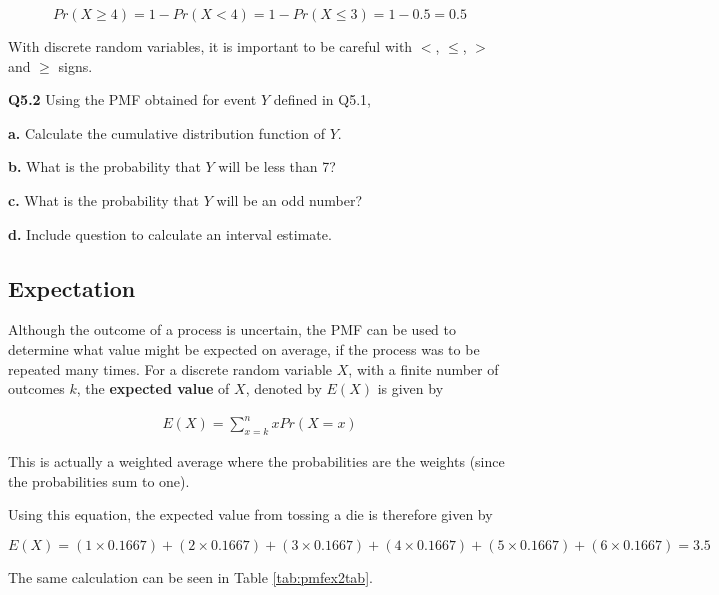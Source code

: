 \documentclass[
  oneside]{krantz}
\begin{document}
\[Pr(X \ge 4) = 1 - Pr(X < 4) = 1 - Pr(X \le 3) = 1 - 0.5 = 0.5\]

With discrete random variables, it is important to be careful with \(<\), \(\le\), \(>\) and \(\ge\) signs.

\textbf{Q5.2} Using the PMF obtained for event \(Y\) defined in Q5.1,

\textbf{a.} Calculate the cumulative distribution function of \(Y\).

\textbf{b.} What is the probability that \(Y\) will be less than 7?

\textbf{c.} What is the probability that \(Y\) will be an odd number?

\textbf{d.} Include question to calculate an interval estimate.

\hypertarget{expectation}{%
\subsection{Expectation}\label{expectation}}

Although the outcome of a process is uncertain, the PMF can be used to determine what value might be expected on average, if the process was to be repeated many times. For a discrete random variable \(X\), with a finite number of outcomes \(k\), the \textbf{expected value} of \(X\), denoted by \(E(X)\) is given by

\begin{align}
E(X) = \sum_{x=k}^n xPr(X=x)
\end{align}

This is actually a weighted average where the probabilities are the weights (since the probabilities sum to one).

Using this equation, the expected value from tossing a die is therefore given by

\[E(X) = (1 \times 0.1667) + (2 \times 0.1667) + (3 \times 0.1667) + (4 \times 0.1667) + (5 \times 0.1667) + (6 \times 0.1667) = 3.5\]

The same calculation can be seen in Table \ref{tab:pmfex2tab}.
\end{document}
